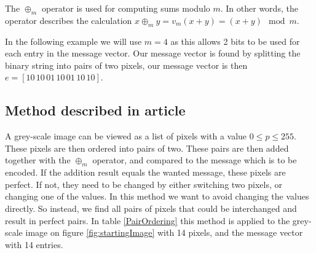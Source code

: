 The $\oplus_m$ operator is used for computing sums modulo $m$. In other words, the operator describes the calculation $x \oplus_m y = v_m(x + y) = (x + y) \mod m$.  

In the following example we will use $m = 4$ as this allows 2 bits to be used for each entry in the message vector. Our message vector is found by splitting the binary string into pairs of two pixels, our message vector is then $e = [10 \, 10 \, 01 \, 10 \, 01 \, 10 \, 10]$. 

\subsection*{Method described in article}

A grey-scale image can be viewed as a list of pixels with a value $0 \leq p \leq 255$. These pixels are then ordered into pairs of two. These pairs are then added together with the $\oplus_m$ operator, and compared to the message which is to be encoded. If the addition result equals the wanted message, these pixels are perfect. If not, they need to be changed by either switching two pixels, or changing one of the values. In this method we want to avoid changing the values directly. So instead, we find all pairs of pixels that could be interchanged and result in perfect pairs. In table \ref{PairOrdering} this method is applied to the grey-scale image on figure \ref{fig:startingImage} with 14 pixels, and the message vector with 14 entries. 

